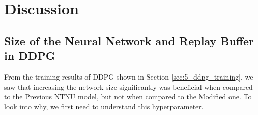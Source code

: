 \chapter{Discussion}
\label{chap:discussion}

\section{Size of the Neural Network and Replay Buffer in DDPG}
\label{sec:6_sizeof_NN}

From the training results of DDPG shown in Section \ref{sec:5_ddpg_training}, we saw that increasing the network size significantly was beneficial when compared to the Previous NTNU model, but not when compared to the Modified one. To look into why, we first need to understand this hyperparameter.


